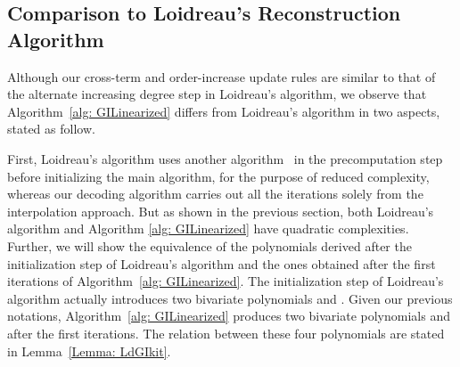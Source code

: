 \documentclass[11pt,onecolumn,draftcls]{IEEEtran}
\begin{document}
\subsection{Comparison to Loidreau's Reconstruction Algorithm}

Although our cross-term and order-increase update rules are similar to that of the alternate increasing degree step in Loidreau's algorithm, we observe that Algorithm~\ref{alg: GILinearized} differs from Loidreau's algorithm in two aspects, stated as follow.

First, Loidreau's algorithm uses another algorithm~\cite{ore_ams34} in the precomputation step before initializing the main algorithm, for the purpose of reduced complexity, whereas our decoding algorithm carries out all the iterations solely from the interpolation approach. But as shown in the previous section, both Loidreau's algorithm and Algorithm \ref{alg: GILinearized} have quadratic complexities. Further, we will show the equivalence of the polynomials derived after the initialization step of Loidreau's algorithm and the ones obtained after the first  iterations of Algorithm~\ref{alg: GILinearized}. The initialization step of Loidreau's algorithm actually introduces two bivariate polynomials  and . Given our previous notations, Algorithm~\ref{alg: GILinearized} produces two bivariate polynomials  and  after the first  iterations. The relation between these four polynomials are stated in Lemma~\ref{Lemma: LdGIkit}.
\end{document}
